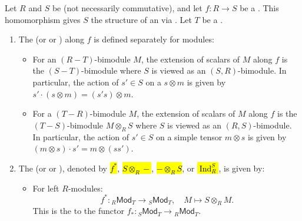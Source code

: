 \begin{definition}  \label{definition:extension_of_scalars_base_change_induction_for_modules_along_ring_homomorphisms}
Let $R$ and $S$ be  (not necessarily commutative), and let $f: R \to S$ be a . This homomorphism gives $S$ the structure of an  via . Let $T$ be a .

\begin{enumerate}
    \item 
    The  (or  or ) along $f$ is defined separately for modules:
    \begin{itemize}
        \item For an $(R-T)$-bimodule $M$, the extension of scalars of $M$ along $f$ is the $(S-T)$-bimodule  where $S$ is viewed as an $(S, R)$-bimodule. In particular, the action of $s' \in S$ on a  $s \otimes m$ is given by $s' \cdot (s \otimes m) = (s's) \otimes m$.
        
        \item For a $(T-R)$-bimodule $M$, the extension of scalars of $M$ along $f$ is the $(T-S)$-bimodule $M \otimes_R S$ where $S$ is viewed as an $(R, S)$-bimodule. In particular, the action of $s' \in S$ on a simple tensor $m \otimes s$ is given by $(m \otimes s) \cdot s' = m \otimes (ss')$.
    \end{itemize}

    \item The  (or  or ), denoted by \hl{$f^*$}, \hl{$S \otimes_R -$}, \hl{$- \otimes_R S$}, or \hl{$\operatorname{Ind}_R^S$}, is given by:
    \begin{itemize}
        \item For left $R$-modules:
        $$f^*: {}_R\mathsf{Mod}_T \to {}_S\mathsf{Mod}_T, \quad M \mapsto S \otimes_R M.$$
         This is the  to the  functor $f_*: {}_S\mathsf{Mod}_{T} \to {}_R\mathsf{Mod}_{T}$.
        

\end{itemize}
\end{enumerate}
\end{definition}
